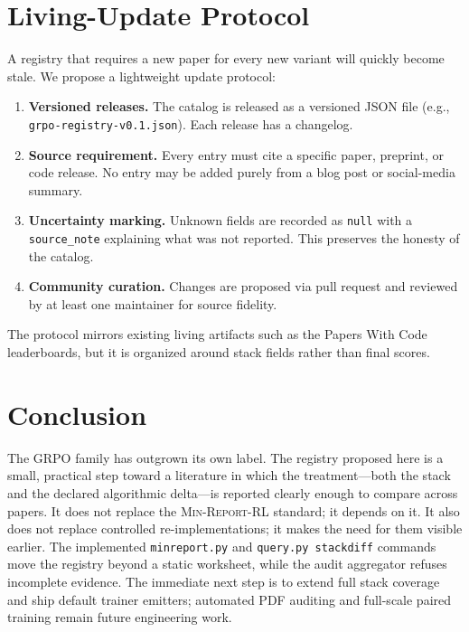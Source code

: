 \documentclass[11pt]{article}
\newcommand{\minreport}{\textsc{Min-Report-RL}}
\newcommand{\grpo}{\textsc{GRPO}}
\begin{document}
\section{Living-Update Protocol}
\label{sec:update}

A registry that requires a new paper for every new variant will quickly become
stale. We propose a lightweight update protocol:

\begin{enumerate}[leftmargin=1.6em, itemsep=2pt]
  \item \textbf{Versioned releases.} The catalog is released as a versioned
    JSON file (e.g., \texttt{grpo-registry-v0.1.json}). Each release has a
    changelog.
  \item \textbf{Source requirement.} Every entry must cite a specific paper,
    preprint, or code release. No entry may be added purely from a blog post or
    social-media summary.
  \item \textbf{Uncertainty marking.} Unknown fields are recorded as
    \texttt{null} with a \texttt{source\_note} explaining what was not
    reported. This preserves the honesty of the catalog.
  \item \textbf{Community curation.} Changes are proposed via pull request and
    reviewed by at least one maintainer for source fidelity.
\end{enumerate}

The protocol mirrors existing living artifacts such as the Papers With Code
leaderboards, but it is organized around stack fields rather than final scores.

\section{Conclusion}
\label{sec:conclusion}

The \grpo{} family has outgrown its own label. The registry proposed here is a
small, practical step toward a literature in which the treatment---both the
stack and the declared algorithmic delta---is reported clearly enough to
compare across papers. It does not replace the \minreport{} standard; it
depends on it. It also does not replace controlled re-implementations; it makes
the need for them visible earlier. The implemented \texttt{minreport.py} and
\texttt{query.py stackdiff} commands move the registry beyond a static
worksheet, while the audit aggregator refuses incomplete evidence. The
immediate next step is to extend full stack coverage and ship default trainer
emitters; automated PDF auditing and full-scale paired training remain future
engineering work.
\end{document}
